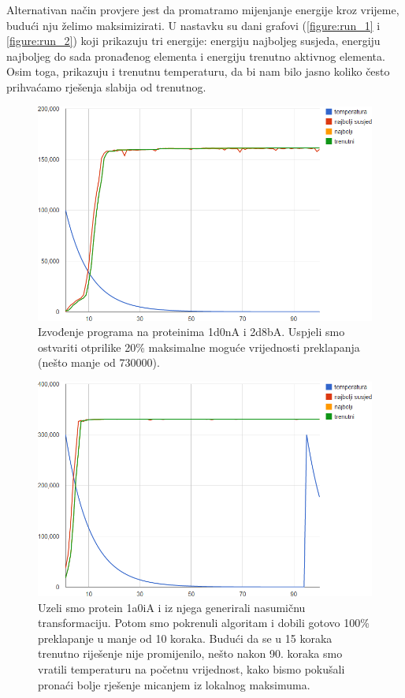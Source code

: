 \documentclass[times, utf8, zavrsni]{fer}
\begin{document}
Alternativan način provjere jest da promatramo 
mijenjanje energije kroz vrijeme,
budući nju želimo maksimizirati. U nastavku
su dani grafovi (\autoref{figure:run_1} i \autoref{figure:run_2})
koji prikazuju tri energije: energiju najboljeg
susjeda, energiju najboljeg do sada pronađenog elementa i
energiju trenutno aktivnog elementa. Osim toga, prikazuju i
trenutnu temperaturu, da bi nam bilo jasno koliko često
prihvaćamo rješenja slabija od trenutnog. 

\begin{figure}
\centering
\includegraphics[scale=0.7]{res/run_1.png}
\caption[Izvođenje programa na proteinima 1d0nA i 2d8bA]{Izvođenje programa
na proteinima 1d0nA i 2d8bA. Uspjeli smo ostvariti otprilike
20\% maksimalne moguće vrijednosti preklapanja (nešto manje od 730000).}
\label{figure:run_1}
\end{figure}

\begin{figure}
\centering
\includegraphics[scale=0.7]{res/run_2.png}
\caption[Izvođenje programa na proteinu 1a0iA i njegovoj nasumičnoj
transformaciji]{Uzeli smo protein 1a0iA i iz njega generirali
nasumičnu transformaciju. Potom smo pokrenuli algoritam i dobili gotovo
100\% preklapanje u manje od 10 koraka. Budući da se u 15 koraka
trenutno riješenje nije promijenilo, nešto nakon 90. koraka
smo vratili temperaturu na početnu vrijednost, kako bismo pokušali
pronaći bolje rješenje micanjem iz lokalnog maksimuma.}
\label{figure:run_2}
\end{figure}
\end{document}
